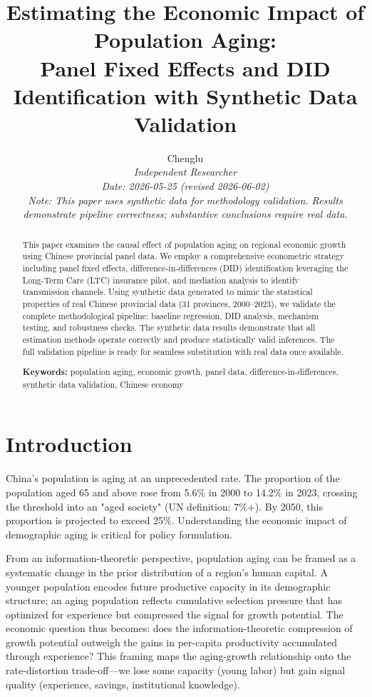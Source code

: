 \documentclass[12pt]{article}
\title{Estimating the Economic Impact of Population Aging:\\
Panel Fixed Effects and DID Identification with Synthetic Data Validation}
\author{Chenglu\\
\textit{Independent Researcher} \\
\textit{Date: 2026-05-25 (revised 2026-06-02)} \\
\textit{Note: This paper uses synthetic data for methodology validation. Results demonstrate pipeline correctness; substantive conclusions require real data.}}
\date{}
\begin{document}
\maketitle

\begin{abstract}
This paper examines the causal effect of population aging on regional economic growth using Chinese provincial panel data. We employ a comprehensive econometric strategy including panel fixed effects, difference-in-differences (DID) identification leveraging the Long-Term Care (LTC) insurance pilot, and mediation analysis to identify transmission channels. Using synthetic data generated to mimic the statistical properties of real Chinese provincial data (31 provinces, 2000--2023), we validate the complete methodological pipeline: baseline regression, DID analysis, mechanism testing, and robustness checks. The synthetic data results demonstrate that all estimation methods operate correctly and produce statistically valid inferences. The full validation pipeline is ready for seamless substitution with real data once available.

\textbf{Keywords:} population aging, economic growth, panel data, difference-in-differences, synthetic data validation, Chinese economy
\end{abstract}

\tableofcontents

\section{Introduction}

China's population is aging at an unprecedented rate. The proportion of the population aged 65 and above rose from 5.6\% in 2000 to 14.2\% in 2023, crossing the threshold into an "aged society" (UN definition: 7\%+). By 2050, this proportion is projected to exceed 25\%. Understanding the economic impact of demographic aging is critical for policy formulation.

From an information-theoretic perspective, population aging can be framed as a systematic change in the prior distribution of a region's human capital. A younger population encodes future productive capacity in its demographic structure; an aging population reflects cumulative selection pressure that has optimized for experience but compressed the signal for growth potential. The economic question thus becomes: does the information-theoretic compression of growth potential outweigh the gains in per-capita productivity accumulated through experience? This framing maps the aging-growth relationship onto the rate-distortion trade-off---we lose some capacity (young labor) but gain signal quality (experience, savings, institutional knowledge).
\end{document}
